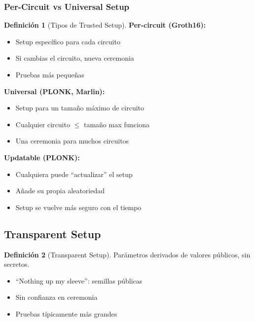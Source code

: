 \documentclass[11pt,a4paper,twoside,openright]{book}
\theoremstyle{definition}
\newtheorem{definition}{Definición}[chapter]
\theoremstyle{plain}
\theoremstyle{remark}
\begin{document}
\subsubsection{Per-Circuit vs Universal Setup}

\begin{definition}[Tipos de Trusted Setup]
\textbf{Per-circuit (Groth16):}
\begin{itemize}
    \item Setup específico para cada circuito
    \item Si cambias el circuito, nueva ceremonia
    \item Pruebas más pequeñas
\end{itemize}

\textbf{Universal (PLONK, Marlin):}
\begin{itemize}
    \item Setup para un tamaño máximo de circuito
    \item Cualquier circuito $\leq$ tamaño max funciona
    \item Una ceremonia para muchos circuitos
\end{itemize}

\textbf{Updatable (PLONK):}
\begin{itemize}
    \item Cualquiera puede ``actualizar'' el setup
    \item Añade su propia aleatoriedad
    \item Setup se vuelve más seguro con el tiempo
\end{itemize}
\end{definition}

\subsection{Transparent Setup}

\begin{definition}[Transparent Setup]
Parámetros derivados de valores públicos, sin secretos.
\end{definition}

\begin{itemize}
    \item ``Nothing up my sleeve'': semillas públicas
    \item Sin confianza en ceremonia
    \item Pruebas típicamente más grandes
\end{itemize}
\end{document}
